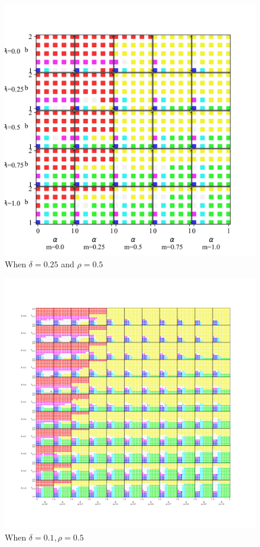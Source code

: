 \documentclass{article}
\begin{document}
\begin{figure}[h]
    \centering
    \includegraphics[width=\textwidth]{D025R050.png}
    \caption{When $\delta = 0.25$ and $\rho = 0.5$}
    \label{fig:d25r050}
\end{figure}

\begin{figure}[h]
    \centering
    \includegraphics[width=\textwidth]{Four_D010R050.png}
    \caption{When $\delta = 0.1, \rho = 0.5$}
    \label{fig:d01r05}
\end{figure}
\end{document}
